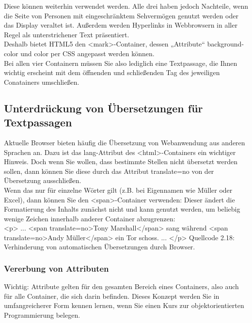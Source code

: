 Diese können weiterhin verwendet werden. Alle drei haben jedoch Nachteile, wenn die Seite von Personen mit eingeschränktem Sehvermögen genutzt werden oder das Display veraltet ist. Außerdem werden Hyperlinks in Webbrowsern in aller Regel als unterstrichener Text präsentiert.\\

Deshalb bietet HTML5 den <mark>-Container, dessen „Attribute“ background-color und color per CSS angepasst werden können. \\

Bei allen vier Containern müssen Sie also lediglich eine Textpassage, die Ihnen wichtig erscheint mit dem öffnenden und schließenden Tag des jeweiligen Conatainers umschließen.

\subsection{Unterdrückung von Übersetzungen für Textpassagen}

Aktuelle Browser bieten häufig die Übersetzung von Webanwendung aus anderen Sprachen an. Dazu ist das lang-Attribut des <html>-Containers ein wichtiger Hinweis. Doch wenn Sie wollen, dass bestimmte Stellen nicht übersetzt werden sollen, dann können Sie diese durch das Attribut translate=no von der Übersetzung ausschließen.\\

Wenn das nur für einzelne Wörter gilt (z.B. bei Eigennamen wie Müller oder Excel), dann können Sie den <span>-Container verwenden: Dieser ändert die Formatierung des Inhalts zunächst nicht und kann genutzt werden, um beliebig wenige Zeichen innerhalb anderer Container abzugrenzen:\\

<p> 
... 
<span translate=no>Tony Marshall</span> sang während 
<span translate=no>Andy Müller</span> ein Tor schoss. 
...
</p>
Quellcode 2.18: Verhinderung von automatischen Übersetzungen durch Browser.

\subsubsection{Vererbung von Attributen}

Wichtig: Attribute gelten für den gesamten Bereich eines Containers, also auch für alle Container, die sich darin befinden. Dieses Konzept werden Sie in umfangreicherer Form kennen lernen, wenn Sie einen Kurs zur objektorientierten Programmierung belegen.\\

